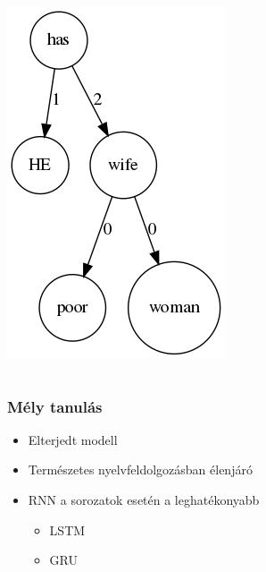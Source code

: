 \documentclass[bigger]{beamer}
\begin{document}
\begin{frame}
\begin{columns}
\begin{column}{0.3\textwidth}
	\pause \includegraphics[scale=0.4]{pics/wifeexp.png}
	\end{column}
\end{columns}
\end{frame}


\begin{frame}
	\frametitle{M\'ely tanul\'as}
	\begin{itemize}
		\item Elterjedt modell
		\item Term\'eszetes nyelvfeldolgoz\'asban \'elenj\'ar\'o
		\item RNN a sorozatok eset\'en a leghat\'ekonyabb
		\begin{itemize}
			\item LSTM
			\item GRU
		\end{itemize}
	\end{itemize}
\end{frame}

\end{document}
